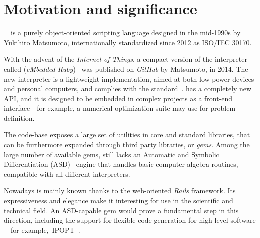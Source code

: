 
\section{Motivation and significance}
\label{sec:motivation}

\Ruby~\cite{flanagan2008ruby}~is a purely object-oriented scripting language designed in the mid-1990s by Yukihiro Matsumoto, internationally standardized since 2012 as ISO/IEC 30170.

With the advent of the \emph{Internet of Things}, a compact version of the \Ruby interpreter called \Mruby (\emph{eMbedded Ruby})~\cite{tanaka2015mruby} was published on \emph{GitHub} by Matsumoto, in 2014. The new interpreter is a lightweight implementation, aimed at both low power devices and personal computers, and complies with the standard~\cite{iso30170}. \Mruby has a completely new API, and it is designed to be embedded in complex projects as a front-end interface---for example, a numerical optimization suite may use \Mruby for problem definition.

The \Ruby code-base exposes a large set of utilities in core and standard libraries, that can be furthermore expanded through third party libraries, or \emph{gems}. Among the large number of available gems, \Ruby still lacks an Automatic and Symbolic Differentiation (ASD)~\cite{tolsma1998computational} engine that handles basic computer algebra routines, compatible with all different \Ruby interpreters.

Nowadays \Ruby is mainly known thanks to the web-oriented \emph{Rails} framework. Its expressiveness and elegance make it interesting for use in the scientific and technical field. An ASD-capable gem would prove a fundamental step in this direction, including the support for flexible code generation for high-level software---for example,\ IPOPT~\cite{wachter2009ipopt, wachter2006}\@.

